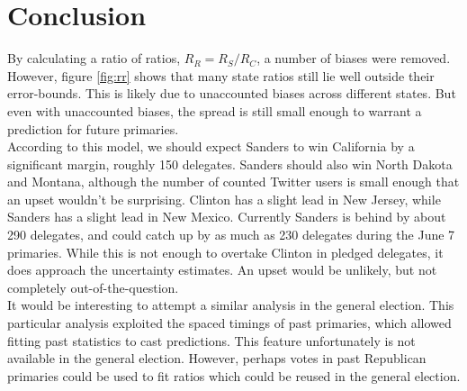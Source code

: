 \documentclass[12pt]{extarticle}
\begin{document}
\section{Conclusion}
By calculating a ratio of ratios, $R_R = R_S / R_C$, a number of biases were removed.
However, figure \ref{fig:rr} shows that many state ratios still lie well outside their error-bounds.
This is likely due to unaccounted biases across different states.
But even with unaccounted biases, the spread is still small enough to warrant a prediction for future primaries.
\\
\indent
According to this model, we should expect Sanders to win California by a significant margin, roughly 150 delegates.
Sanders should also win North Dakota and Montana, although the number of counted Twitter users is small enough that an upset wouldn't be surprising.
Clinton has a slight lead in New Jersey, while Sanders has a slight lead in New Mexico.
Currently Sanders is behind by about 290 delegates, and could catch up by as much as 230 delegates during the June 7 primaries.
While this is not enough to overtake Clinton in pledged delegates, it does approach the uncertainty estimates.
An upset would be unlikely, but not completely out-of-the-question.
\\
\indent
It would be interesting to attempt a similar analysis in the general election.
This particular analysis exploited the spaced timings of past primaries, which allowed fitting past statistics to cast predictions.
This feature unfortunately is not available in the general election.
However, perhaps votes in past Republican primaries could be used to fit ratios which could be reused in the general election.
\end{document}
